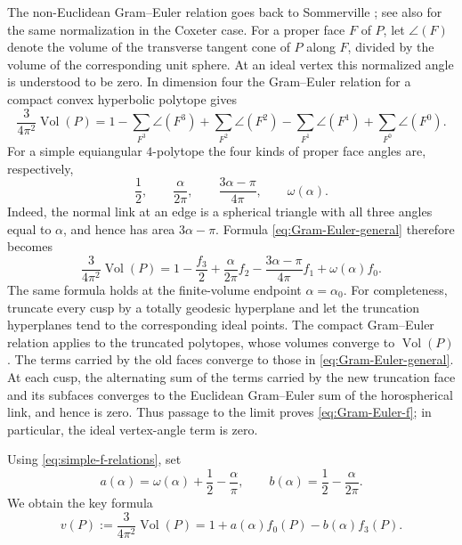 \documentclass[12pt,a4paper]{article}
\theoremstyle{thmstyleone}
\theoremstyle{thmstylethree}
\theoremstyle{thmstyletwo}
\newcommand{\Vol}{\operatorname{Vol}}
\begin{document}
The non-Euclidean Gram--Euler relation goes back to Sommerville
\cite{Sommerville1927}; see also \cite{Heckman1995} for the same
normalization in the Coxeter case.  For a proper face $F$ of $P$, let
$\angle(F)$ denote the volume of the transverse tangent cone of $P$ along $F$, divided by the
volume of the corresponding unit sphere.  At an ideal vertex this normalized
angle is understood to be zero.  In dimension four the Gram--Euler relation
for a compact convex hyperbolic polytope gives
\begin{equation}\label{eq:Gram-Euler-general}
 \frac{3}{4\pi^2}\Vol(P)
 =1-\sum_{F^3}\angle(F^3)+\sum_{F^2}\angle(F^2)
 -\sum_{F^1}\angle(F^1)+\sum_{F^0}\angle(F^0).
\end{equation}
For a simple equiangular $4$-polytope the four kinds of proper face angles
are, respectively,
\[
 \frac12,
 \qquad
 \frac{\alpha}{2\pi},
 \qquad
 \frac{3\alpha-\pi}{4\pi},
 \qquad
 \omega(\alpha).
\]
Indeed, the normal link at an edge is a spherical triangle with all three
angles equal to $\alpha$, and hence has area $3\alpha-\pi$.  Formula
\eqref{eq:Gram-Euler-general} therefore becomes
\begin{equation}\label{eq:Gram-Euler-f}
 \frac{3}{4\pi^2}\Vol(P)
 =1-\frac{f_3}2+\frac{\alpha}{2\pi}f_2
 -\frac{3\alpha-\pi}{4\pi}f_1+\omega(\alpha)f_0.
\end{equation}
The same formula holds at the finite-volume endpoint
$\alpha=\alpha_0$.  For completeness, truncate every cusp by a totally
geodesic hyperplane and let the truncation hyperplanes tend to the
corresponding ideal points.  The compact Gram--Euler relation applies to the
truncated polytopes, whose volumes converge to $\Vol(P)$.  The terms carried
by the old faces converge to those in
\eqref{eq:Gram-Euler-general}.  At each cusp, the alternating sum of the
terms carried by the new truncation face and its subfaces converges to the
Euclidean Gram--Euler sum of the horospherical link, and hence is zero.
Thus passage to the limit proves \eqref{eq:Gram-Euler-f}; in particular, the
ideal vertex-angle term is zero.

Using \eqref{eq:simple-f-relations}, set
\begin{equation}\label{eq:a-b-def}
 a(\alpha)=\omega(\alpha)+\frac12-\frac{\alpha}{\pi},
 \qquad
 b(\alpha)=\frac12-\frac{\alpha}{2\pi}.
\end{equation}
We obtain the key formula
\begin{equation}\label{eq:volume-linear}
 v(P):=\frac{3}{4\pi^2}\Vol(P)
 =1+a(\alpha)f_0(P)-b(\alpha)f_3(P).
\end{equation}
\end{document}
